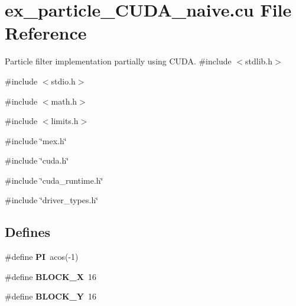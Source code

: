 \hypertarget{ex__particle__CUDA__naive_8cu}{
\section{ex\_\-particle\_\-CUDA\_\-naive.cu File Reference}
\label{ex__particle__CUDA__naive_8cu}
}


Particle filter implementation partially using CUDA.  
{\ttfamily \#include $<$stdlib.h$>$}\par
{\ttfamily \#include $<$stdio.h$>$}\par
{\ttfamily \#include $<$math.h$>$}\par
{\ttfamily \#include $<$limits.h$>$}\par
{\ttfamily \#include \char`\"{}mex.h\char`\"{}}\par
{\ttfamily \#include \char`\"{}cuda.h\char`\"{}}\par
{\ttfamily \#include \char`\"{}cuda\_\-runtime.h\char`\"{}}\par
{\ttfamily \#include \char`\"{}driver\_\-types.h\char`\"{}}\par
\subsection*{Defines}
\begin{DoxyCompactItemize}
\item 
\hypertarget{ex__particle__CUDA__naive_8cu_a598a3330b3c21701223ee0ca14316eca}{
\#define {\bfseries PI}~acos(-\/1)}
\label{ex__particle__CUDA__naive_8cu_a598a3330b3c21701223ee0ca14316eca}

\item 
\hypertarget{ex__particle__CUDA__naive_8cu_a165bd291e719c4542ebcb897b0fa5481}{
\#define {\bfseries BLOCK\_\-X}~16}
\label{ex__particle__CUDA__naive_8cu_a165bd291e719c4542ebcb897b0fa5481}

\item 
\hypertarget{ex__particle__CUDA__naive_8cu_a9e261e89727a3aafdc4d8732f5b3389f}{
\#define {\bfseries BLOCK\_\-Y}~16}
\label{ex__particle__CUDA__naive_8cu_a9e261e89727a3aafdc4d8732f5b3389f}

\end{DoxyCompactItemize}
